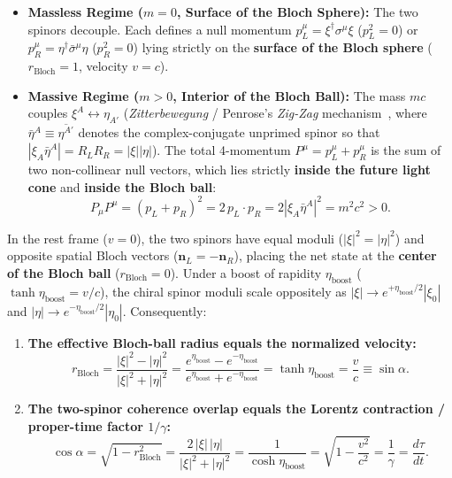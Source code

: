 \documentclass[11pt,a4paper]{article}
\begin{document}
\begin{itemize}
    \item \textbf{Massless Regime ($m = 0$, Surface of the Bloch Sphere):} The two spinors decouple. Each defines a null momentum $p_L^\mu = \xi^\dagger \sigma^\mu \xi$ ($p_L^2 = 0$) or $p_R^\mu = \eta^\dagger \bar{\sigma}^\mu \eta$ ($p_R^2 = 0$) lying strictly on the \textbf{surface of the Bloch sphere} ($r_{\text{Bloch}} = 1$, velocity $v = c$).
    \item \textbf{Massive Regime ($m > 0$, Interior of the Bloch Ball):} The mass $mc$ couples $\xi^A \leftrightarrow \eta_{A'}$ (\emph{Zitterbewegung} / Penrose's \emph{Zig-Zag} mechanism~\cite{PenroseRoad2004}, where $\bar{\eta}^A \equiv \overline{\eta^{A'}}$ denotes the complex-conjugate unprimed spinor so that $|\xi_A\bar{\eta}^A| = R_L R_R = |\xi||\eta|$). The total 4-momentum $P^\mu = p_L^\mu + p_R^\mu$ is the sum of two non-collinear null vectors, which lies strictly \textbf{inside the future light cone} and \textbf{inside the Bloch ball}:
    \begin{equation}
    P_\mu P^\mu = (p_L + p_R)^2 = 2\, p_L \cdot p_R = 2 \left| \xi_A \bar{\eta}^A \right|^2 = m^2 c^2 > 0.
    \end{equation}
\end{itemize}

In the rest frame ($v = 0$), the two spinors have equal moduli ($|\xi|^2 = |\eta|^2$) and opposite spatial Bloch vectors ($\mathbf{n}_L = -\mathbf{n}_R$), placing the net state at the \textbf{center of the Bloch ball} ($r_{\text{Bloch}} = 0$). Under a boost of rapidity $\eta_{\text{boost}}$ ($\tanh\eta_{\text{boost}} = v/c$), the chiral spinor moduli scale oppositely as $|\xi| \to e^{+\eta_{\text{boost}}/2}|\xi_0|$ and $|\eta| \to e^{-\eta_{\text{boost}}/2}|\eta_0|$. Consequently:
\begin{enumerate}
    \item \textbf{The effective Bloch-ball radius equals the normalized velocity:}
    \begin{equation}
    r_{\text{Bloch}} = \frac{|\xi|^2 - |\eta|^2}{|\xi|^2 + |\eta|^2} = \frac{e^{\eta_{\text{boost}}} - e^{-\eta_{\text{boost}}}}{e^{\eta_{\text{boost}}} + e^{-\eta_{\text{boost}}}} = \tanh\eta_{\text{boost}} = \frac{v}{c} \equiv \sin\alpha.
    \end{equation}
    \item \textbf{The two-spinor coherence overlap equals the Lorentz contraction / proper-time factor $1/\gamma$:}
    \begin{equation}
    \cos\alpha = \sqrt{1 - r_{\text{Bloch}}^2} = \frac{2\,|\xi|\,|\eta|}{|\xi|^2 + |\eta|^2} = \frac{1}{\cosh\eta_{\text{boost}}} = \sqrt{1 - \frac{v^2}{c^2}} = \frac{1}{\gamma} = \frac{d\tau}{dt}.
    \end{equation}
\end{enumerate}
\end{document}
